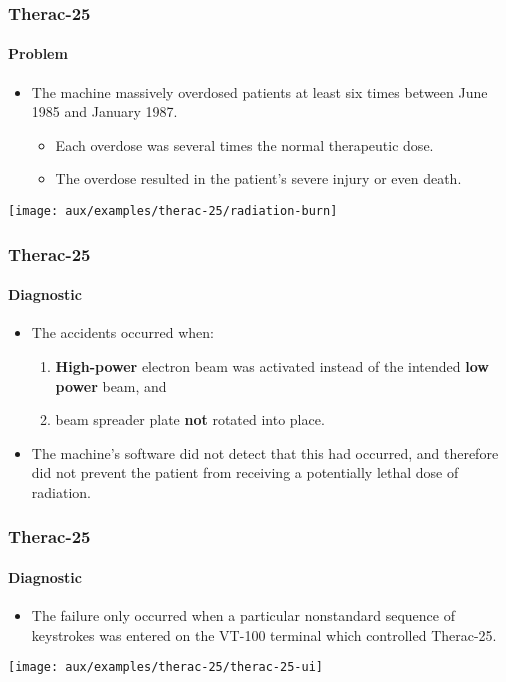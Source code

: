 \begin{frame}
\frametitle{Therac-25}
\framesubtitle{Problem}

\begin{itemize}
	\item The machine massively overdosed patients at least six times
	between June 1985 and January 1987.
	\begin{itemize}
		\item Each overdose was several times the normal therapeutic dose.

		\item The overdose resulted in the patient's severe injury or even
		death.
	\end{itemize}
\end{itemize}

\begin{block:ie}{}
	\centering
	\texttt{[image: aux/examples/therac-25/radiation-burn]}
\end{block:ie}

\end{frame}


\begin{frame}
\frametitle{Therac-25}
\framesubtitle{Diagnostic}

\begin{itemize}
	\item The accidents occurred when:
	\begin{enumerate}
		\item \textbf{High-power} electron beam was activated instead of the
		intended \textbf{low power} beam, and
		\item beam spreader plate \textbf{not} rotated into place.
	\end{enumerate}

	\item The machine's software did not detect that this had occurred,
	and therefore did not prevent the patient from receiving a
	potentially lethal dose of radiation.
\end{itemize}
\end{frame}


\begin{frame}
\frametitle{Therac-25}
\framesubtitle{Diagnostic}

\begin{itemize}
	\item The failure only occurred when a particular nonstandard sequence of
	keystrokes was entered on the VT-100 terminal which controlled Therac-25.
\end{itemize}

\begin{block:ie}{}
	\centering
	\texttt{[image: aux/examples/therac-25/therac-25-ui]}
\end{block:ie}
\end{frame}


